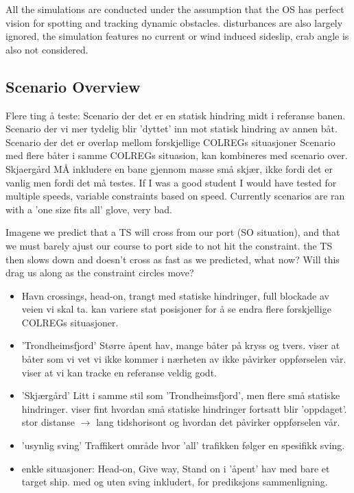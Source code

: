 All the simulations are conducted under the assumption that the \gls{OS} has perfect vision for spotting and tracking dynamic obstacles.
disturbances are also largely ignored, the simulation features no current or wind induced sideslip, crab angle is also not considered.

\subsection{Scenario Overview}
\iffalse
Flere ting å teste:
Scenario der det er en statisk hindring midt i referanse banen.
Scenario der vi mer tydelig blir 'dyttet' inn mot statisk hindring av annen båt.
Scenario der det er overlap mellom forskjellige COLREGs situasjoner
Scenario med flere båter i samme COLREGs situasion, kan kombineres med scenario over.
Skjaergård MÅ inkludere en bane gjennom masse små skjær, ikke fordi det er vanlig men fordi det må testes.
If I was a good student I would have tested for multiple speeds, variable constraints based on speed.
Currently scenarios are ran with a 'one size fits all' glove, very bad.

Imagene we predict that a TS will cross from our port (SO situation), and that we must barely ajust our course to port side to
not hit the constraint. the TS then slows down and doesn't cross as fast as we predicted, what now? Will this drag us along as the
constraint circles move?

\begin{itemize}
    \item Havn
    \subitem crossings, head-on, trangt med statiske hindringer, full blockade av veien vi skal ta.
    \subitem kan variere stat posisjoner for å se endra flere forskjellige COLREGs situasjoner.
    \item 'Trondheimsfjord'
    \subitem Større åpent hav, mange båter på kryss og tvers.
    \subitem viser at båter som vi vet vi ikke kommer i nærheten av ikke påvirker oppførselen vår.
    \subitem viser at vi kan tracke en referanse veldig godt.
    \item 'Skjærgård'
    \subitem Litt i samme stil som 'Trondheimsfjord', men flere små statiske hindringer.
    \subitem viser fint hvordan små statiske hindringer fortsatt blir 'oppdaget'.
    \subitem stor distanse $\rightarrow$ lang tidshorisont og hvordan det påvirker oppførselen vår.
    \item 'usynlig sving'
    \subitem Traffikert område hvor 'all' trafikken følger en spesifikk sving.
    \item enkle situasjoner:
    \subitem Head-on, Give way, Stand on i 'åpent' hav med bare et target ship.
    \subitem med og uten sving inkludert, for prediksjons sammenligning.
\end{itemize}

